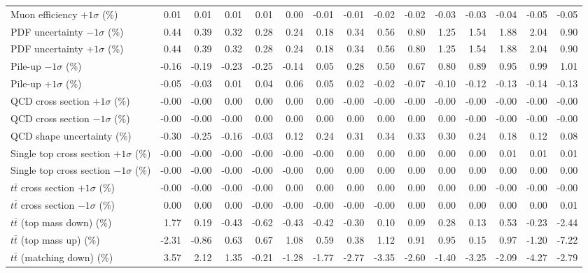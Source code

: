 \begin{table}[htbp]
{\begin{tabular}{lrrrrrrrrrrrrrr}
Muon efficiency $+1\sigma$ (\%) & 0.01 & 0.01 & 0.01 & 0.01 & 0.00 & -0.01 & -0.01 & -0.02 & -0.02 & -0.03 & -0.03 & -0.04 & -0.05 & -0.05 \\ 
PDF uncertainty $-1\sigma$ (\%) & 0.44 & 0.39 & 0.32 & 0.28 & 0.24 & 0.18 & 0.34 & 0.56 & 0.80 & 1.25 & 1.54 & 1.88 & 2.04 & 0.90 \\ 
PDF uncertainty $+1\sigma$ (\%) & 0.44 & 0.39 & 0.32 & 0.28 & 0.24 & 0.18 & 0.34 & 0.56 & 0.80 & 1.25 & 1.54 & 1.88 & 2.04 & 0.90 \\ 
Pile-up $-1\sigma$ (\%) & -0.16 & -0.19 & -0.23 & -0.25 & -0.14 & 0.05 & 0.28 & 0.50 & 0.67 & 0.80 & 0.89 & 0.95 & 0.99 & 1.01 \\ 
Pile-up $+1\sigma$ (\%) & -0.05 & -0.03 & 0.01 & 0.04 & 0.06 & 0.05 & 0.02 & -0.02 & -0.07 & -0.10 & -0.12 & -0.13 & -0.14 & -0.13 \\ 
QCD cross section \ensuremath{+1\sigma} (\%) & -0.00 & -0.00 & 0.00 & 0.00 & 0.00 & 0.00 & -0.00 & -0.00 & -0.00 & -0.00 & -0.00 & -0.00 & -0.00 & -0.00 \\ 
QCD cross section \ensuremath{-1\sigma} (\%) & -0.00 & -0.00 & -0.00 & 0.00 & 0.00 & 0.00 & 0.00 & 0.00 & 0.00 & 0.00 & -0.00 & -0.00 & -0.00 & -0.00 \\ 
QCD shape uncertainty (\%) & -0.30 & -0.25 & -0.16 & -0.03 & 0.12 & 0.24 & 0.31 & 0.34 & 0.33 & 0.30 & 0.24 & 0.18 & 0.12 & 0.08 \\ 
Single top cross section $+1\sigma$ (\%) & -0.00 & -0.00 & -0.00 & -0.00 & -0.00 & -0.00 & 0.00 & 0.00 & 0.00 & 0.00 & 0.00 & 0.01 & 0.01 & 0.01 \\ 
Single top cross section $-1\sigma$ (\%) & -0.00 & -0.00 & -0.00 & -0.00 & -0.00 & 0.00 & 0.00 & 0.00 & 0.00 & 0.00 & 0.00 & 0.00 & 0.00 & 0.00 \\ 
$t\bar{t}$ cross section $+1\sigma$ (\%) & -0.00 & -0.00 & -0.00 & -0.00 & 0.00 & 0.00 & 0.00 & 0.00 & 0.00 & 0.00 & 0.00 & -0.00 & -0.00 & -0.00 \\ 
$t\bar{t}$ cross section $-1\sigma$ (\%) & 0.00 & 0.00 & 0.00 & -0.00 & -0.00 & -0.00 & -0.00 & -0.00 & 0.00 & 0.00 & 0.00 & 0.00 & 0.00 & 0.01 \\ 
$t\bar{t}$ (top mass down) (\%) & 1.77 & 0.19 & -0.43 & -0.62 & -0.43 & -0.42 & -0.30 & 0.10 & 0.09 & 0.28 & 0.13 & 0.53 & -0.23 & -2.44 \\ 
$t\bar{t}$ (top mass up) (\%) & -2.31 & -0.86 & 0.63 & 0.67 & 1.08 & 0.59 & 0.38 & 1.12 & 0.91 & 0.95 & 0.15 & 0.97 & -1.20 & -7.22 \\ 
$t\bar{t}$ (matching down) (\%) & 3.57 & 2.12 & 1.35 & -0.21 & -1.28 & -1.77 & -2.77 & -3.35 & -2.60 & -1.40 & -3.25 & -2.09 & -4.27 & -2.79 \\ 

\end{tabular}}
\end{table}
